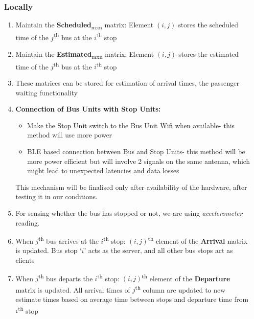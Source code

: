 \subsubsection{Locally}

\begin{enumerate}

    \item Maintain the \textbf{Scheduled}\textsubscript{mxn} matrix: Element $(i, j)$ stores the scheduled time of the $j$\textsuperscript{th} bus at the $i$\textsuperscript{th} stop
    \item Maintain the \textbf{Estimated}\textsubscript{mxn} matrix: Element $(i, j)$ stores the estimated time of the $j$\textsuperscript{th} bus at the $i$\textsuperscript{th} stop
    \item These matrices can be stored for estimation of arrival times, the passenger waiting functionality
\item
    \textbf{Connection of Bus Units with Stop Units:} 
\begin{itemize}
    \item Make the Stop Unit switch to the Bus Unit Wifi when available- this method will use more power
    \item BLE based connection between Bus and Stop Units- this method will be more power efficient but will involve 2 signals on the same antenna, which might lead to unexpected latencies and data losses
\end{itemize}

This mechanism will be finalised only after availability of the hardware, after testing it in our conditions.

    \item For sensing whether the bus has stopped or not, we are using \textit{\gls{accelerometer}} reading.
    \item When $j$\textsuperscript{th} bus arrives at the $i$\textsuperscript{th} stop: $(i, j)$\textsuperscript{th} element of the \textbf{Arrival} matrix is updated. Bus stop `$i$' acts as the server, and all other bus stops act as clients
    \item When $j$\textsuperscript{th} bus departs the $i$\textsuperscript{th} stop: $(i, j)$\textsuperscript{th} element of the \textbf{Departure} matrix is updated. All arrival times of $j$\textsuperscript{th} column are updated to new estimate times based on average time between stops and departure time from $i$\textsuperscript{th} stop
    

\end{enumerate}
